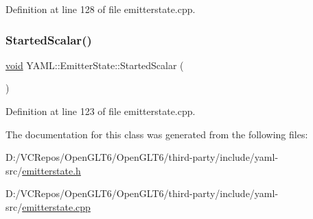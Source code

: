 Definition at line 128 of file emitterstate.\+cpp.

\mbox{\label{class_y_a_m_l_1_1_emitter_state_ace1874d4251a739c99f34ff7e0d133cc}} 
\subsubsection{\texorpdfstring{StartedScalar()}{StartedScalar()}}
{\footnotesize\ttfamily \mbox{\hyperlink{glad_8h_a950fc91edb4504f62f1c577bf4727c29}{void}} Y\+A\+M\+L\+::\+Emitter\+State\+::\+Started\+Scalar (\begin{DoxyParamCaption}{ }\end{DoxyParamCaption})}



Definition at line 123 of file emitterstate.\+cpp.



The documentation for this class was generated from the following files\+:\begin{DoxyCompactItemize}
\item 
D\+:/\+V\+C\+Repos/\+Open\+G\+L\+T6/\+Open\+G\+L\+T6/third-\/party/include/yaml-\/src/\mbox{\hyperlink{emitterstate_8h}{emitterstate.\+h}}\item 
D\+:/\+V\+C\+Repos/\+Open\+G\+L\+T6/\+Open\+G\+L\+T6/third-\/party/include/yaml-\/src/\mbox{\hyperlink{emitterstate_8cpp}{emitterstate.\+cpp}}\end{DoxyCompactItemize}
